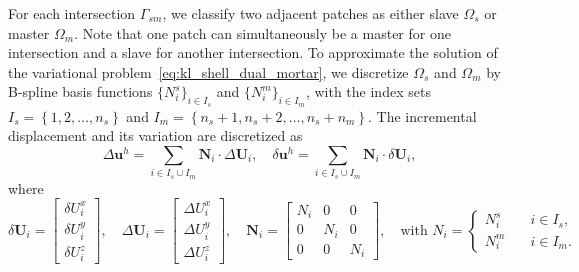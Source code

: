 For each intersection $\Gamma_{sm}$, we classify two adjacent patches as either slave $\Omega_s$ or master $\Omega_m$. Note that one patch can simultaneously be a master for one intersection and a slave for another intersection. To approximate the solution of the variational problem~\eqref{eq:kl_shell_dual_mortar}, we discretize $\Omega_s$ and $\Omega_m$ by B-spline basis functions $\{N^s_i\}_{i\in{I_s}}$ and $\{N^m_i\}_{i\in{I_m}}$, with the index sets $I_s=\left\{1, 2, \dots, n_s\right\}$ and $I_m=\left\{n_s+1, n_s+2, \dots, n_s+n_m\right\}$. The incremental displacement and its variation are discretized as
\begin{equation}
	\Delta\mathbf{u}^h = \sum_{i\in I_s \cup I_m} \mathbf{N}_i\cdot\Delta\mathbf{U}_i,\quad \delta\mathbf{u}^h = \sum_{i\in I_s \cup I_m} \mathbf{N}_i\cdot\delta\mathbf{U}_i,
\end{equation}
where
\begin{equation}
	\delta\mathbf{U}_i = \begin{bmatrix}
		\delta U_i^x \\
		\delta U_i^y \\
		\delta U_i^z
	\end{bmatrix},\quad
	\Delta\mathbf{U}_i = \begin{bmatrix}
		\Delta U_i^x \\
		\Delta U_i^y \\
		\Delta U_i^z
	\end{bmatrix},\quad
	\mathbf{N}_i = \begin{bmatrix}
		N_i & 0   & 0   \\
		0   & N_i & 0   \\
		0   & 0   & N_i
	\end{bmatrix},\quad
	\text{with }
	N_i=
	\begin{cases}
		N_i^s \quad & i\in{I_s}, \\
		N_i^m \quad & i\in{I_m}.
	\end{cases}
\end{equation}

